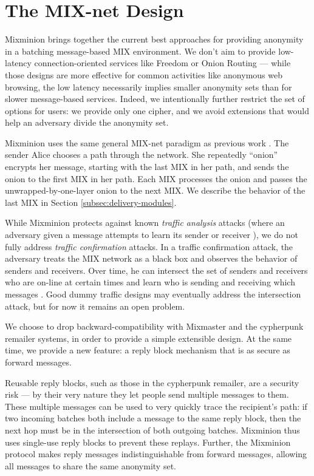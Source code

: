 \documentclass{llncs}
\begin{document}

\section{The MIX-net Design}
\label{sec:design}

Mixminion brings together the current best approaches for providing
anonymity in a batching message-based MIX environment. We don't aim
to provide low-latency connection-oriented services like Freedom
\cite{freedom} or Onion Routing \cite{goldschlag99} --- while those
designs are more effective for common activities like anonymous web
browsing, the low latency necessarily implies smaller anonymity sets
than for slower message-based services. Indeed, we intentionally
further restrict the set of options for users: we provide only one
cipher, and we avoid extensions that would help an adversary divide the
anonymity set.

Mixminion uses the same general MIX-net paradigm as previous work
\cite{chaum-mix,mixmaster-attacks,babel}. The sender Alice chooses a
path through the network. She repeatedly ``onion'' encrypts her message,
starting with the last
MIX in her path, and sends the onion to the first MIX in her path. Each
MIX processes the onion and passes the unwrapped-by-one-layer onion to
the next MIX. We describe the behavior of the last MIX in
Section \ref{subsec:delivery-modules}.

While Mixminion protects against known \emph{traffic analysis} attacks
(where an adversary given a message attempts to learn its sender or
receiver \cite{rackoff93cryptographic,raymond00}), we do not fully
address \emph{traffic
confirmation} attacks. In a traffic confirmation attack, the adversary
treats the MIX network as a black box and observes the behavior of
senders and receivers. Over time, he can intersect the set of senders
and receivers who are on-line at certain times and learn who is sending
and receiving which messages \cite{langos02}. Good dummy traffic designs
may eventually address the intersection attack, but for now it remains
an open problem.

We choose to drop backward-compatibility with Mixmaster and the cypherpunk
remailer systems, in order to provide a simple extensible design. At
the same time, we provide a new feature: a reply block mechanism that
is as secure as forward messages.

Reusable reply blocks, such as those in the cypherpunk remailer, are a
security risk --- by their very nature they let people send multiple
messages to them. These multiple messages can be used to very quickly
trace the recipient's path: if two incoming batches both include a
message to the same reply block, then the next hop must be in the
intersection of both outgoing batches. Mixminion thus uses single-use
reply blocks to prevent these replays. Further, the Mixminion protocol
makes reply messages indistinguishable from forward messages, allowing
all messages to share the same anonymity set.
\end{document}
